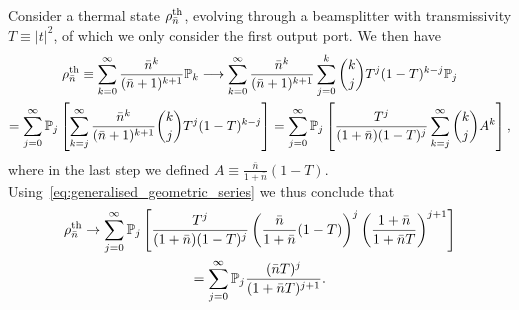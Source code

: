 \documentclass[12pt]{report}
\newcommand{\PP}{\mathbb{P}}
\begin{document}
\begin{prop}
	Consider a thermal state $\rho^{\rm th}_{\bar n}$, evolving through a beamsplitter with transmissivity $T\equiv |t|^2$, of which we only consider the first output port. We then have
	\begin{equation}
	\begin{gathered}
		\rho^{\rm th}_{\bar n}
		\equiv \sum_{k=0}^\infty \frac{\bar n^k}{(\bar n+1)^{k+1}}\PP_k
		\longrightarrow
		\sum_{k=0}^\infty \frac{\bar n^k}{(\bar n+1)^{k+1}}
		\sum_{j=0}^k \binom{k}{j} T^j (1-T)^{k-j} \PP_j \\
		= \sum_{j=0}^\infty \PP_j \left[
			\sum_{k=j}^\infty 
			\frac{\bar n^k}{(\bar n+1)^{k+1}}
			\binom{k}{j}
			T^j (1-T)^{k-j}
		\right]
		= \sum_{j=0}^\infty \PP_j \left[
			\frac{T^j}{(1+\bar n)(1-T)^j}
			\sum_{k=j}^\infty \binom{k}{j} A^k
		\right],
	\end{gathered}
	\end{equation}
	where in the last step we defined $A\equiv \frac{\bar n}{1+\bar n}(1-T)$.
	Using~\cref{eq:generalised_geometric_series} we thus conclude that
	\begin{equation}
	\begin{gathered}
		\rho^{\rm th}_{\bar n} \to
		\sum_{j=0}^\infty \PP_j
		\left[
			\frac{T^j}{(1+\bar n)(1-T)^j}
			\left(\frac{\bar n}{1+\bar n}(1-T)\right)^j
			\left(\frac{1+\bar n}{1+\bar n T}\right)^{j+1}
		\right] \\
		= \sum_{j=0}^\infty \PP_j
		\frac{(\bar n T)^j}{(1+\bar nT)^{j+1}}.
	\end{gathered}
	\end{equation}
\end{prop}
\end{document}
